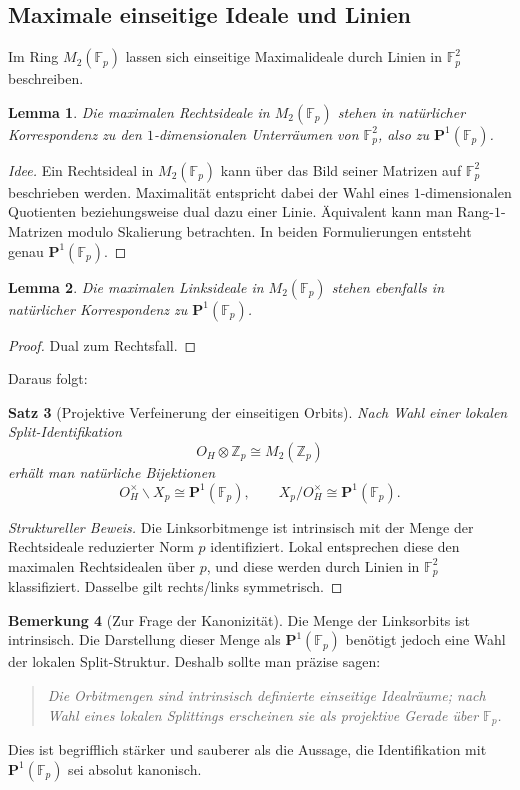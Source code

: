 \documentclass[12pt,a4paper]{article}
\newtheorem{satz}{Satz}[section]
\newtheorem{lemma}[satz]{Lemma}
\theoremstyle{definition}
\newtheorem{bemerkung}[satz]{Bemerkung}
\newcommand{\OH}{O_H}
\newcommand{\Z}{\mathbb{Z}}
\newcommand{\Fp}{\mathbb{F}_p}
\begin{document}
	\subsection{Maximale einseitige Ideale und Linien}
	
	Im Ring \(M_2(\Fp)\) lassen sich einseitige Maximalideale durch Linien in \(\Fp^2\) beschreiben.
	
	\begin{lemma}
		Die maximalen Rechtsideale in \(M_2(\Fp)\) stehen in natürlicher Korrespondenz zu den \(1\)-dimensionalen Unterräumen von \(\Fp^2\), also zu \(\mathbf P^1(\Fp)\).
	\end{lemma}
	
	\begin{proof}[Idee]
		Ein Rechtsideal in \(M_2(\Fp)\) kann über das Bild seiner Matrizen auf \(\Fp^2\) beschrieben werden. Maximalität entspricht dabei der Wahl eines \(1\)-dimensionalen Quotienten beziehungsweise dual dazu einer Linie. Äquivalent kann man Rang-\(1\)-Matrizen modulo Skalierung betrachten. In beiden Formulierungen entsteht genau \(\mathbf P^1(\Fp)\).
	\end{proof}
	
	\begin{lemma}
		Die maximalen Linksideale in \(M_2(\Fp)\) stehen ebenfalls in natürlicher Korrespondenz zu \(\mathbf P^1(\Fp)\).
	\end{lemma}
	
	\begin{proof}
		Dual zum Rechtsfall.
	\end{proof}
	
	Daraus folgt:
	
	\begin{satz}[Projektive Verfeinerung der einseitigen Orbits]
		Nach Wahl einer lokalen Split-Identifikation
		\[
		\OH\otimes \Z_p \cong M_2(\Z_p)
		\]
		erhält man natürliche Bijektionen
		\[
		\OH^\times\backslash X_p \cong \mathbf P^1(\Fp),
		\qquad
		X_p/\OH^\times \cong \mathbf P^1(\Fp).
		\]
	\end{satz}
	
	\begin{proof}[Struktureller Beweis]
		Die Linksorbitmenge ist intrinsisch mit der Menge der Rechtsideale reduzierter Norm \(p\) identifiziert. Lokal entsprechen diese den maximalen Rechtsidealen über \(p\), und diese werden durch Linien in \(\Fp^2\) klassifiziert. Dasselbe gilt rechts/links symmetrisch.
	\end{proof}
	
	\begin{bemerkung}[Zur Frage der Kanonizität]
		Die Menge der Linksorbits ist intrinsisch. Die Darstellung dieser Menge als \(\mathbf P^1(\Fp)\) benötigt jedoch eine Wahl der lokalen Split-Struktur. Deshalb sollte man präzise sagen:
		\begin{quote}
			\emph{Die Orbitmengen sind intrinsisch definierte einseitige Idealräume; nach Wahl eines lokalen Splittings erscheinen sie als projektive Gerade über \(\Fp\).}
		\end{quote}
		Dies ist begrifflich stärker und sauberer als die Aussage, die Identifikation mit \(\mathbf P^1(\Fp)\) sei absolut kanonisch.
	\end{bemerkung}
	
\end{document}

